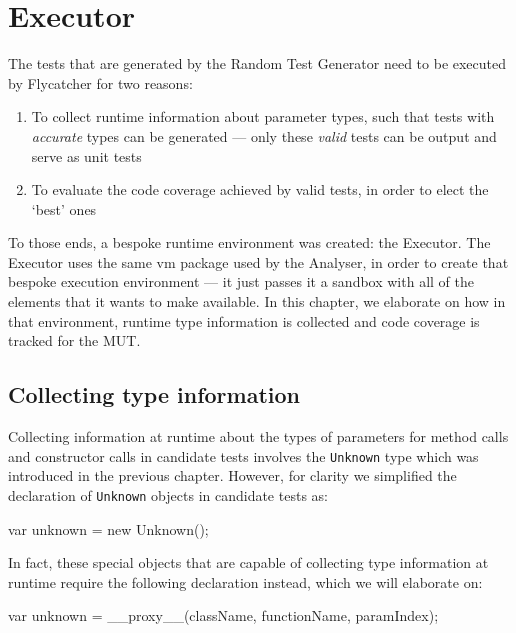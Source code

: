 \chapter{Executor}
The tests that are generated by the \textsf{Random Test Generator} need to be executed by \textsf{Flycatcher} for two reasons:

\begin{enumerate}
   \item To collect runtime information about parameter types, such that tests with \emph{accurate} types can be generated --- only these \emph{valid} tests can be output and serve as unit tests
   \item To evaluate the code coverage achieved by valid tests, in order to elect the `best' ones
\end{enumerate}

To those ends, a bespoke runtime environment was created: the \textsf{Executor}. The \textsf{Executor} uses the same \textsf{vm} package used by the \textsf{Analyser}, in order to create that bespoke execution environment --- it just passes it a sandbox with all of the elements that it wants to make available. In this chapter, we elaborate on how in that environment, runtime type information is collected and code coverage is tracked for the MUT.


\section{Collecting type information}
Collecting information at runtime about the types of parameters for method calls and constructor calls in candidate tests involves the \texttt{Unknown} type which was introduced in the previous chapter. However, for clarity we simplified the declaration of \texttt{Unknown} objects in candidate tests as:

\begin{code}
var unknown = new Unknown();
\end{code}

\noindent In fact, these special objects that are capable of collecting type information at runtime require the following declaration instead, which we will elaborate on:

\begin{code}
var unknown = __proxy__(className, functionName, paramIndex);
\end{code}

